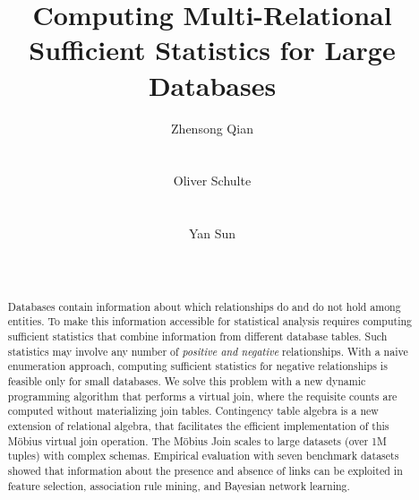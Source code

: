 \documentclass{sig-alternate-2013}
\begin{document}
\title{Computing Multi-Relational Sufficient Statistics for  Large Databases}

\author{
\alignauthor
Zhensong Qian\\
       \\
       \\
\alignauthor
Oliver Schulte \\
       \\
       \\
\alignauthor
Yan Sun\\
       \\
       \\
}
\maketitle  

\begin{abstract} Databases contain information about which relationships do and do not hold among entities. To make this information accessible for statistical analysis requires computing sufficient statistics  that combine information from different database tables. Such statistics may involve any number of {\em positive and negative} relationships. With a naive enumeration approach, computing sufficient statistics for negative relationships is feasible only for small databases. We solve this problem with a new dynamic programming algorithm that performs a virtual join, where the requisite counts are computed without materializing join tables. 
Contingency table algebra is a new extension of relational algebra, that facilitates the efficient implementation of this M\"obius virtual join operation. 
The M\"obius Join scales to large datasets (over 1M tuples) with complex schemas. Empirical evaluation with seven benchmark datasets showed that information about the presence and absence of links can be exploited in feature selection, association rule mining, and Bayesian network learning. 

 \end{abstract}
\end{document}
